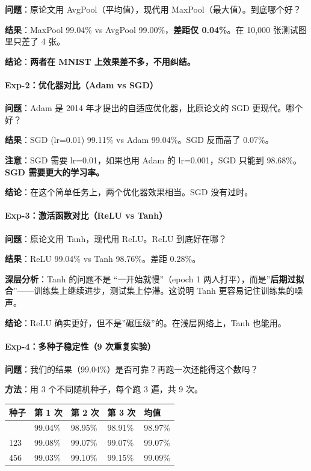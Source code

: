 \documentclass[
  11pt,
]{ctexart}
\newcounter{none} %
\begin{document}
\textbf{问题}：原论文用 AvgPool（平均值），现代用
MaxPool（最大值）。到底哪个好？

\textbf{结果}：MaxPool 99.04\% vs AvgPool 99.00\%，\textbf{差距仅
0.04\%}。在 10,000 张测试图里只差了 4 张。

\textbf{结论}：\textbf{两者在 MNIST 上效果差不多，不用纠结。}

\paragraph{Exp-2：优化器对比（Adam vs
SGD）}\label{exp-2ux4f18ux5316ux5668ux5bf9ux6bd4adam-vs-sgd}

\textbf{问题}：Adam 是 2014 年才提出的自适应优化器，比原论文的 SGD
更现代。哪个好？

\textbf{结果}：SGD (lr=0.01) 99.11\% vs Adam 99.04\%。SGD 反而高了
0.07\%。

\textbf{注意}：SGD 需要 lr=0.01，如果也用 Adam 的 lr=0.001，SGD 只能到
98.68\%。\textbf{SGD 需要更大的学习率。}

\textbf{结论}：在这个简单任务上，两个优化器效果相当。SGD 没有过时。

\paragraph{Exp-3：激活函数对比（ReLU vs
Tanh）}\label{exp-3ux6fc0ux6d3bux51fdux6570ux5bf9ux6bd4relu-vs-tanh}

\textbf{问题}：原论文用 Tanh，现代用 ReLU。ReLU 到底好在哪？

\textbf{结果}：ReLU 99.04\% vs Tanh 98.76\%。差距 0.28\%。

\textbf{深层分析}：Tanh 的问题不是 “一开始就慢”（epoch 1
两人打平），而是”\textbf{后期过拟合}”——训练集上继续进步，测试集上停滞。这说明
Tanh 更容易记住训练集的噪声。

\textbf{结论}：ReLU 确实更好，但不是”碾压级”的。在浅层网络上，Tanh
也能用。

\paragraph{Exp-4：多种子稳定性（9
次重复实验）}\label{exp-4ux591aux79cdux5b50ux7a33ux5b9aux60279-ux6b21ux91cdux590dux5b9eux9a8c}

\textbf{问题}：我们的结果（99.04\%）是否可靠？再跑一次还能得这个数吗？

\textbf{方法}：用 3 个不同随机种子，每个跑 3 遍，共 9 次。

{\def\LTcaptype{none} %
\begin{longtable}[]{@{}lllll@{}}
\toprule\noalign{}
种子 & 第 1 次 & 第 2 次 & 第 3 次 & 均值 \\
\midrule\noalign{}
\endhead
\bottomrule\noalign{}
\endlastfoot
42 & 99.04\% & 98.95\% & 98.91\% & 98.97\% \\
123 & 99.08\% & 99.07\% & 99.07\% & 99.07\% \\
456 & 99.03\% & 99.10\% & 99.15\% & 99.09\% \\
\end{longtable}
}
\end{document}
